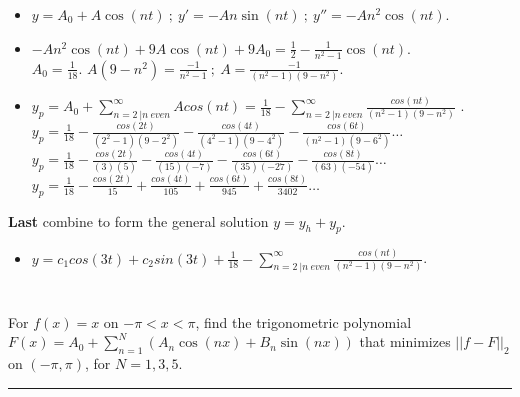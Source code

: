 \documentclass[10pt]{article}
\begin{document}
\begin{itemize}
    \item $ \displaystyle y = A_0 + A \cos(nt) \ ; \ y' = -An \sin(nt) \ ; \ y'' = -An^2 \cos(nt) $. \\
    \item $ \displaystyle -An^2 \cos(nt) + 9A \cos(nt) + 9A_0 = \frac{1}{2} - \frac{1}{n^2 - 1} \cos(nt) $. \\
    \subitem $ \displaystyle A_0 = \frac{1}{18} $.
    \subitem $ \displaystyle A(9 - n^2) = \frac{-1}{n^2 - 1} \ ; \ A = \frac{-1}{(n^2 - 1)(9 - n^2)} $.
    \item $ \displaystyle y_p = A_0 + \sum_{n = 2 \ | n \ even}^{\infty} Acos(nt) =  \frac{1}{18} - \sum_{n = 2 \ | n \ even}^{\infty} \frac{cos(nt)}{(n^2 - 1)(9 - n^2)} $ . \\
    \subitem $ \displaystyle y_p = \frac{1}{18} - \frac{cos(2t)}{(2^2 - 1)(9 - 2^2)} - \frac{cos(4t)}{(4^2 - 1)(9 - 4^2)} - \frac{cos(6t)}{(n^2 - 1)(9 - 6^2)} \dots $
    \subitem $ \displaystyle y_p = \frac{1}{18} - \frac{cos(2t)}{(3)(5)} - \frac{cos(4t)}{(15)(-7)} - \frac{cos(6t)}{(35)(-27)} - \frac{cos(8t)}{(63)(-54)} \dots $
    \subitem $ \displaystyle y_p = \frac{1}{18} - \frac{cos(2t)}{15} + \frac{cos(4t)}{105} + \frac{cos(6t)}{945} + \frac{cos(8t)}{3402} \dots $ \\
\end{itemize}

\noindent
\textbf{Last} combine to form the general solution $ y = y_h + y_p $. \\

\begin{itemize}
    \item $ \displaystyle y = c_1 cos(3t) + c_2 sin(3t) + \frac{1}{18} - \sum_{n = 2 \ | n \ even}^{\infty} \frac{cos(nt)}{(n^2 - 1)(9 - n^2)} $.
\end{itemize}


\newpage


\section{\underline{}}
\label{sec: Problem 2}
\noindent
For $ f(x) = x $ on $ -\pi < x < \pi $, find the trigonometric polynomial $ \displaystyle F(x) = A_0 + \sum_{n = 1}^N (A_n\cos(nx) + B_n\sin(nx)) $ that minimizes $ ||f-F||_2 $ on $ (-\pi, \pi) $, for $ N = 1, 3, 5 $. \\
\vspace{2.5mm}
\hrule

\vspace{7.5mm}
\end{document}
